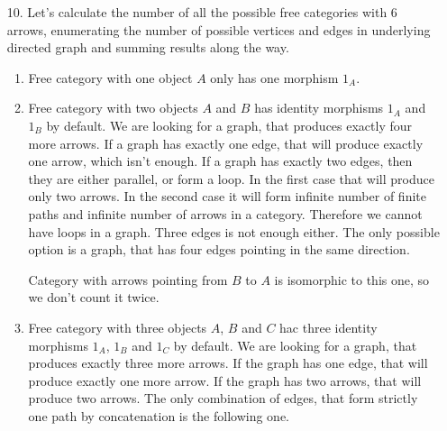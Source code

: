 \documentclass[12pt]{article}
\begin{document}
\begin{enumerate}
  \item[10.]
    Let's calculate the number of all the possible free categories with 6 arrows, enumerating the number of possible vertices and edges in underlying directed graph and summing results along the way.
    \begin{enumerate}
      \item Free category with one object $A$ only has one morphism $1_A$.
      \item Free category with two objects $A$ and $B$ has identity morphisms $1_A$ and $1_B$ by default. We are looking for a graph, that produces exactly four more arrows. If a graph has exactly one edge, that will produce exactly one arrow, which isn't enough. If a graph has exactly two edges, then they are either parallel, or form a loop. In the first case that will produce only two arrows. In the second case it will form infinite number of finite paths and infinite number of arrows in a category. Therefore we cannot have loops in a graph. Three edges is not enough either. The only possible option is a graph, that has four edges pointing in the same direction.
            \begin{figure}[H]
              \centering
            \end{figure}
            Category with arrows pointing from $B$ to $A$ is isomorphic to this one, so we don't count it twice.
      \item Free category with three objects $A$, $B$ and $C$ hac three identity morphisms $1_A$, $1_B$ and $1_C$ by default. We are looking for a graph, that produces exactly three more arrows. If the graph has one edge, that will produce exactly one more arrow. If the graph has two arrows, that will produce two arrows. The only combination of edges, that form strictly one path by concatenation is the following one.
            \begin{figure}[H]
              \centering
              \begin{tikzpicture}

\end{tikzpicture}
\end{figure}
\end{enumerate}
\end{enumerate}
\end{document}
